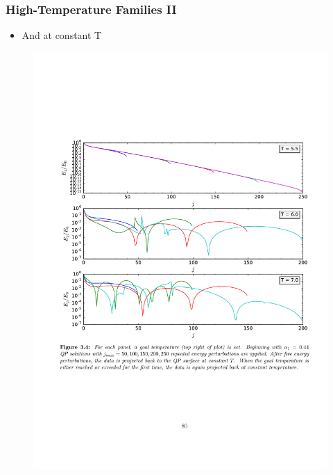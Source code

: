 \documentclass[mathserif,10pt]{beamer}
\newcommand{\bi}{\begin{itemize}}
\newcommand{\ei}{\end{itemize}}
\newcommand{\its}{\item}
\begin{document}
{\frame
{
  \frametitle{High-Temperature Families II}
  \bi
  \its And at \alert{constant T}
  \ei
   \begin{figure}
    \centering
    \includegraphics[scale=0.5]{constantTproj}
  \end{figure}
}

}
\end{document}
